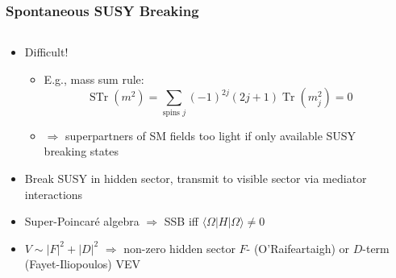 \documentclass[10pt,aspectratio=169]{beamer}
\newcommand*\widefbox[1]{\fbox{\hspace{0.5em}#1\hspace{0.5em}}}
\DeclareMathOperator{\Tr}{Tr}
\DeclareMathOperator{\STr}{STr}
\begin{document}
\begin{frame}
  \frametitle{Spontaneous SUSY Breaking}
  \begin{columns}[t]
    \begin{column}{0.5\textwidth}
      \begin{itemize}\itemsep1em
      \item \alert{Difficult!}
        \begin{itemize}
        \item E.g., mass sum rule:
          \begin{equation*}
            \STr(m^2) = \sum_{\text{spins } j} (-1)^{2j} (2 j + 1) \Tr(m_j^2)
            = 0
          \end{equation*}
        \item $\Rightarrow$ superpartners of SM fields too light if only
          available SUSY breaking states
        \end{itemize}
      \item Break SUSY in hidden sector, transmit to visible sector via
        mediator interactions
      \item Super-Poincar\'{e} algebra $\Rightarrow$ SSB iff $\langle \Omega
        | H | \Omega \rangle \neq 0$
      \item $V \sim |F|^2 + |D|^2$ $\Rightarrow$ non-zero hidden sector $F$-
        (O'Raifeartaigh) or $D$-term (Fayet-Iliopoulos) VEV
      \end{itemize}
    \end{column}
    \begin{column}{0.5\textwidth}
      \begin{center}
\end{center}
\end{column}
\end{columns}
\end{frame}
\end{document}
